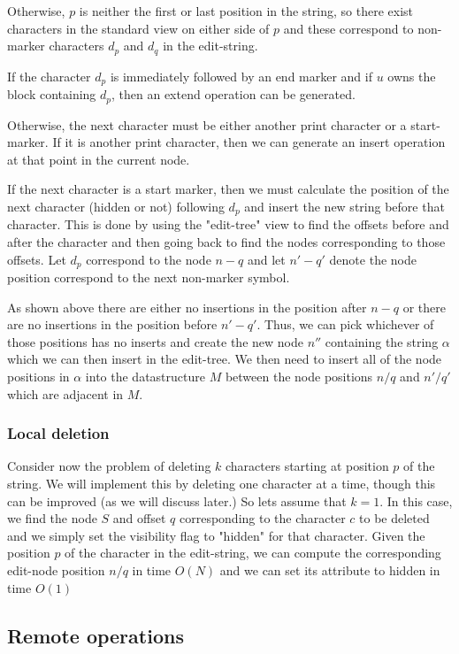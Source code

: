 \documentclass{amsart}
\begin{document}
Otherwise, $p$ is neither the first or last position in the string, so there
exist characters in the standard view on either side of $p$ and these correspond
to non-marker characters $d_p$ and $d_q$ in the edit-string.

If the character $d_p$ is immediately followed by an end marker 
and if $u$ owns the block containing $d_p$, then an extend operation 
can be generated.

Otherwise, the next character must be either another print character or a
start-marker.  If it is another print character, then we can generate an insert
operation at that point in the current node.

If the next character is a start marker, then we must calculate the position
of the next character (hidden or not) following $d_p$ and insert the new
string before that character. This is done 
by using the "edit-tree" view to find the offsets before and after the
character and then going back to find the nodes corresponding to those
offsets. Let $d_p$ correspond to the node $n-q$ and let $n'-q'$ denote
the node position correspond to the next non-marker symbol.

As shown above
there are either no insertions in the position after $n-q$ or there are
no insertions in the position before $n'-q'$.  Thus, we can pick whichever
of those positions has no inserts and create the new node $n''$ containing
the string $\alpha$ which we can then insert in the edit-tree.  We then need
to insert all of the node positions in $\alpha$ into the datastructure $M$
between the node positions $n/q$ and $n'/q'$ which are adjacent in $M$.




\subsubsection{Local deletion}
Consider now the problem of deleting $k$ characters 
starting at position $p$ of the string.
We will implement this by deleting one character at a time, though this can be
improved (as we will discuss later.) So lets assume that $k=1$. In this case,
we find the node $S$ and offset $q$ corresponding to the character $c$ to be deleted
and we simply set the visibility flag to "hidden" for that character.
Given the position $p$ of the character in the edit-string, we can compute the
corresponding edit-node position $n/q$ in time $O(N)$ and we can set its
attribute to hidden in time $O(1)$

\subsection{Remote operations}
\end{document}
